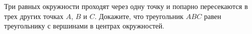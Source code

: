 \begin{ex}
	\begin{condition}
		Три равных окружности проходят через одну точку и попарно пересекаются в трех других точках \( A \), \( B  \) и \( C \). Докажите, что треугольник \( ABC  \) равен треугольнику с вершинами в центрах окружностей.
	\end{condition}
\end{ex}
